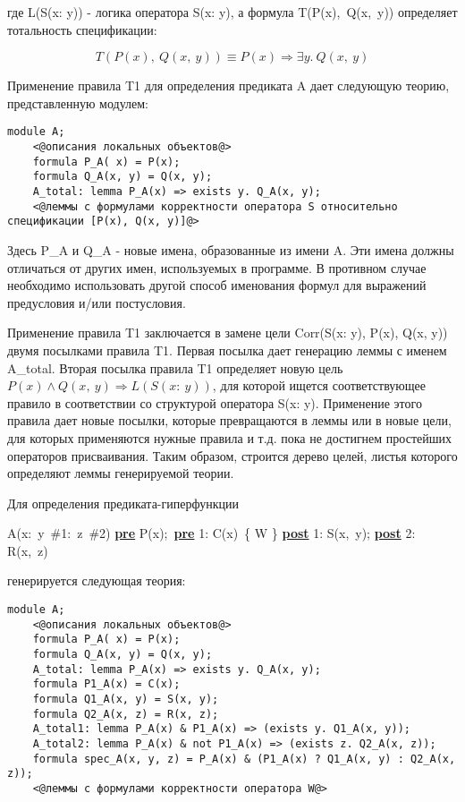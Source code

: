 \documentclass[10pt,a4paper]{article}
\newcommand{\numformula}[2] {
\begin{equation}
\label{eq:#1}
#2
\end{equation}
}
\begin{document}
где L(S(x: y)) - логика оператора S(x: y), а формула T(P(x), Q(x, y)) определяет тотальность спецификации:

\numformula{spectotal} {
T(P(x),~Q(x,~y)) \equiv P(x) \Rightarrow \exists y.~Q(x,~y)
}

Применение правила T1 для определения предиката A дает следующую теорию, представленную модулем:

\begin{lstlisting}
module A;
    <@описания локальных объектов@>
    formula P_A( x) = P(x);
    formula Q_A(x, y) = Q(x, y);
    A_total: lemma P_A(x) => exists y. Q_A(x, y);
    <@леммы с формулами корректности оператора S относительно cпецификации [P(x), Q(x, y)]@>
\end{lstlisting}

Здесь P\_A и Q\_A - новые имена, образованные из имени A. Эти имена должны отличаться от других имен, используемых в программе. В противном случае необходимо использовать другой способ именования формул для выражений предусловия и/или постусловия.

Применение правила T1 заключается в замене цели Corr(S(x: y), P(x), Q(x, y)) двумя посылками правила T1. Первая посылка дает генерацию леммы с именем A\_total. Вторая посылка правила T1 определяет новую цель $ P(x) \land Q(x,~y) \Rightarrow L(S(x:~y)) $, для которой ищется соответствующее правило в соответствии со структурой оператора S(x: y). Применение этого правила дает новые посылки, которые превращаются в леммы или в новые цели, для которых применяются нужные правила и т.д. пока не достигнем простейших операторов присваивания. Таким образом, строится дерево целей, листья которого определяют леммы генерируемой теории.

Для определения предиката-гиперфункции

\begin{center}
\par A(x: y \#1: z \#2) \underline{\textbf{pre}} P(x); \underline{\textbf{pre}} 1: C(x) \{ W \} \underline{\textbf{post}} 1: S(x, y); \underline{\textbf{post}} 2: R(x, z)
\end{center}

генерируется следующая теория:

\begin{lstlisting}
module A;
    <@описания локальных объектов@>
    formula P_A( x) = P(x);
    formula Q_A(x, y) = Q(x, y);
    A_total: lemma P_A(x) => exists y. Q_A(x, y);
    formula P1_A(x) = C(x);
    formula Q1_A(x, y) = S(x, y);
    formula Q2_A(x, z) = R(x, z);
    A_total1: lemma P_A(x) & P1_A(x) => (exists y. Q1_A(x, y));
    A_total2: lemma P_A(x) & not P1_A(x) => (exists z. Q2_A(x, z));
    formula spec_A(x, y, z) = P_A(x) & (P1_A(x) ? Q1_A(x, y) : Q2_A(x, z));
    <@леммы с формулами корректности оператора W@>
\end{lstlisting}
\end{document}
